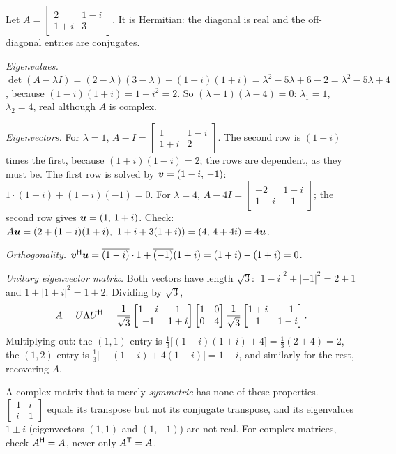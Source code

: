 \begin{example}\label{ex:u30-diag}
Let $A=\begin{bmatrix}2&1-i\\1+i&3\end{bmatrix}$. It is Hermitian: the diagonal is real and the
off-diagonal entries are conjugates.

\emph{Eigenvalues.}
$\det(A-\lambda I)=(2-\lambda)(3-\lambda)-(1-i)(1+i)=\lambda^2-5\lambda+6-2=\lambda^2-5\lambda+4$,
because $(1-i)(1+i)=1-i^2=2$. So $(\lambda-1)(\lambda-4)=0$: $\lambda_1=1$, $\lambda_2=4$, real although
$A$ is complex.

\emph{Eigenvectors.} For $\lambda=1$, $A-I=\left[\begin{smallmatrix}1&1-i\\1+i&2\end{smallmatrix}\right]$.
The second row is $(1+i)$ times the first, because $(1+i)(1-i)=2$; the rows are dependent, as
they must be. The first row is solved by $\boldsymbol{v}=(1-i,\,-1)$: $1\cdot(1-i)+(1-i)(-1)=0$. For
$\lambda=4$, $A-4I=\left[\begin{smallmatrix}-2&1-i\\1+i&-1\end{smallmatrix}\right]$; the second row
gives $\boldsymbol{u}=(1,\,1+i)$. Check: $A\vb{u}=(2+(1-i)(1+i),\ 1+i+3(1+i))=(4,\,4+4i)=4\vb{u}$.

\emph{Orthogonality.} $\boldsymbol{v}^{\mathsf{H}}\boldsymbol{u}=\overline{(1-i)}\cdot1+\overline{(-1)}(1+i)=(1+i)-(1+i)=0$.

\emph{Unitary eigenvector matrix.} Both vectors have length $\sqrt3$: $|1-i|^2+|{-1}|^2=2+1$ and
$1+|1+i|^2=1+2$. Dividing by $\sqrt3$,
\[
  A=U\Lambda U^{\mathsf{H}}=\frac{1}{\sqrt3}\begin{bmatrix}1-i&1\\-1&1+i\end{bmatrix}
  \begin{bmatrix}1&0\\0&4\end{bmatrix}
  \frac{1}{\sqrt3}\begin{bmatrix}1+i&-1\\1&1-i\end{bmatrix}.
\]
Multiplying out: the $(1,1)$ entry is $\tfrac13\bigl[(1-i)(1+i)+4\bigr]=\tfrac13(2+4)=2$, the $(1,2)$
entry is $\tfrac13\bigl[-(1-i)+4(1-i)\bigr]=1-i$, and similarly for the rest, recovering $A$.
\end{example}

\begin{trap}
A complex matrix that is merely \emph{symmetric} has none of these properties.
$\left[\begin{smallmatrix}1&i\\i&1\end{smallmatrix}\right]$ equals its transpose but not its
conjugate transpose, and its eigenvalues $1\pm i$ (eigenvectors $(1,1)$ and $(1,-1)$) are not real.
For complex matrices, check $A^{\mathsf{H}}=A$, never only $A^{\mathsf{T}}=A$.
\end{trap}


